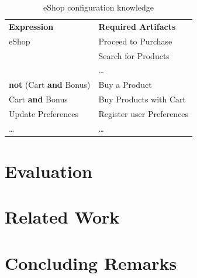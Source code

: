 \documentclass[times, 11pt,twocolumn]{article}
\begin{document}
\begin{table}[th]
\begin{center}
 \caption{eShop configuration knowledge}
\label{tab:ck-running-example}
\begin{tabular}{ll}
   \hline\noalign{\smallskip}
  {\bf Expression} & {\bf Required Artifacts} \\
   \noalign{\smallskip}
   \hline
   \noalign{\smallskip}
    eShop & Proceed to Purchase \\
               & Search for Products \\
               & \ldots \\ 
    {\bf not} (Cart {\bf and} Bonus)\hspace{2pt} & Buy a Product \\ 
    Cart {\bf and} Bonus & Buy Products with Cart \\ 
    Update Preferences & Register user Preferences	 \\  
    \ldots & \ldots \\ 
  \hline
\end{tabular}
\end{center}
\end{table}
\section{Evaluation}\label{sec:evaluation}


\section{Related Work}\label{sec:related}

\section{Concluding Remarks}\label{sec:concludings}




\end{document}
